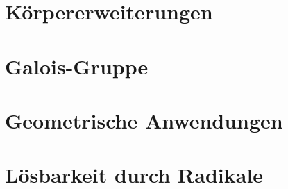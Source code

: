%
%
%
 




\section{Körpererweiterungen}

\section{Galois-Gruppe}

\section{Geometrische Anwendungen}

\section{Lösbarkeit durch Radikale}

